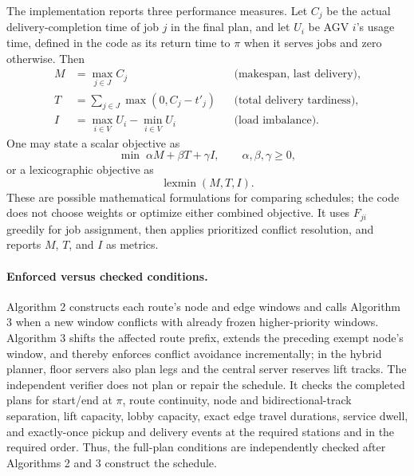The implementation reports three performance measures. Let $C_j$ be the
actual delivery-completion time of job $j$ in the final plan, and let $U_i$
be AGV $i$'s usage time, defined in the code as its return time to $\pi$ when
it serves jobs and zero otherwise. Then
\begin{align*}
  M &= \max_{j\in J} C_j
      &&\text{(makespan, last delivery)},\\
  T &= \sum_{j\in J}\max(0,C_j-t'_j)
      &&\text{(total delivery tardiness)},\\
  I &= \max_{i\in V}U_i-\min_{i\in V}U_i
      &&\text{(load imbalance)}.
\end{align*}
One may state a scalar objective as
\[
  \min\; \alpha M+\beta T+\gamma I,
  \qquad \alpha,\beta,\gamma\ge0,
\]
or a lexicographic objective as
\[
  \operatorname{lexmin}(M,T,I).
\]
These are possible mathematical formulations for comparing schedules; the
code does not choose weights or optimize either combined objective. It uses
$F_{ji}$ greedily for job assignment, then applies prioritized conflict
resolution, and reports $M$, $T$, and $I$ as metrics.

\paragraph{Enforced versus checked conditions.}
Algorithm 2 constructs each route's node and edge windows and calls Algorithm
3 when a new window conflicts with already frozen higher-priority windows.
Algorithm 3 shifts the affected route prefix, extends the preceding exempt
node's window, and thereby enforces conflict avoidance incrementally; in the
hybrid planner, floor servers also plan legs and the central server reserves
lift tracks. The independent verifier does not plan or repair the schedule.
It checks the completed plans for start/end at $\pi$, route continuity,
node and bidirectional-track separation, lift capacity, lobby capacity,
exact edge travel durations, service dwell, and exactly-once pickup and
delivery events at the required stations and in the required order. Thus,
the full-plan conditions are independently checked after Algorithms 2 and 3
construct the schedule.

